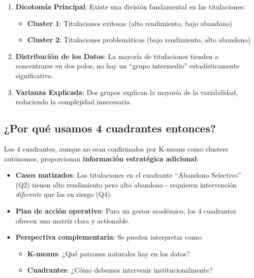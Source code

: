 \documentclass[
]{article}
\providecommand{\tightlist}{%
  \setlength{\itemsep}{0pt}\setlength{\parskip}{0pt}}
\begin{document}
\begin{enumerate}
\def\labelenumi{\arabic{enumi}.}
\item
  \textbf{Dicotomía Principal}: Existe una división fundamental en las
  titulaciones:

  \begin{itemize}
  \tightlist
  \item
    \textbf{Cluster 1}: Titulaciones exitosas (alto rendimiento, bajo
    abandono)
  \item
    \textbf{Cluster 2}: Titulaciones problemáticas (bajo rendimiento,
    alto abandono)
  \end{itemize}
\item
  \textbf{Distribución de los Datos}: La mayoría de titulaciones tienden
  a concentrarse en dos polos, no hay un ``grupo intermedio''
  estadísticamente significativo.
\item
  \textbf{Varianza Explicada}: Dos grupos explican la mayoría de la
  variabilidad, reduciendo la complejidad innecesaria.
\end{enumerate}

\subsection{¿Por qué usamos 4 cuadrantes
entonces?}\label{por-quuxe9-usamos-4-cuadrantes-entonces}

Los 4 cuadrantes, aunque no sean confirmados por K-means como clusters
autónomos, proporcionan \textbf{información estratégica adicional}:

\begin{itemize}
\item
  \textbf{Casos matizados}: Las titulaciones en el cuadrante ``Abandono
  Selectivo'' (Q2) tienen alto rendimiento pero alto abandono -
  requieren intervención \emph{diferente} que las en riesgo (Q4).
\item
  \textbf{Plan de acción operativo}: Para un gestor académico, los 4
  cuadrantes ofrecen una matriz clara y actionable.
\item
  \textbf{Perspectiva complementaria}: Se pueden interpretar como:

  \begin{itemize}
  \tightlist
  \item
    \textbf{K-means}: ¿Qué patrones naturales hay en los datos?
  \item
    \textbf{Cuadrantes}: ¿Cómo debemos intervenir institucionalmente?
  \end{itemize}
\end{itemize}
\end{document}

